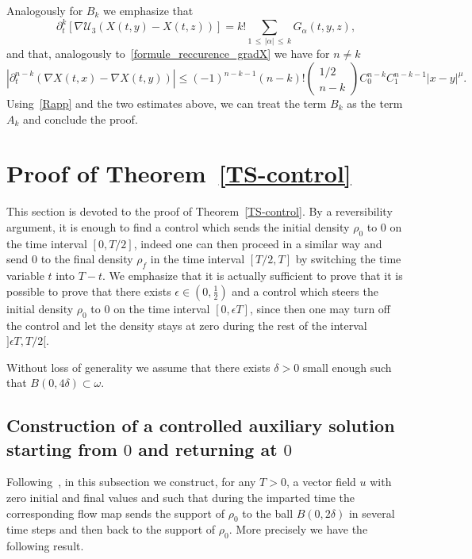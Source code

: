 \documentclass[AHL,Unicode,longabstracts,published]{cedram}
\newcommand{\clU}{\mathcal{U}}
\renewcommand{\leq}{\leqslant}
\newcommand{\eps}{\epsilon}
\begin{document}
Analogously for $B_k$ we emphasize that
\[
\partial_t^k \left[\nabla \clU_3(X(t,y)-X(t,z)) \right]=k! \underset{1\,\leq\,|\alpha|\,\leq\,k}{\sum} G_\alpha(t,y,z),
\]
and that, analogously to~\eqref{formule_reccurence_gradX} we have for $n \neq k$
\[
\left| \partial_t^{n-k}\left(\nabla X(t,x)-\nabla X(t,y)\right) \right|\leq (-1)^{n-k-1}(n-k)!
\begin{pmatrix}
1/2 \\ n-k
\end{pmatrix} C_0^{n-k} C_1^{n-k-1} |x-y|^\mu.
\]
Using~\eqref{Rapp} and the two estimates above, we can treat the term $B_k$ as the term $A_k$ and conclude the proof.



\section{Proof of Theorem~\ref{TS-control}}\label{sec-cont}
\label{sec-control}
This section is devoted to the proof of Theorem~\ref{TS-control}. By a reversibility argument, it is enough to find a control which sends the initial density $\rho_0$ to $0$ on the time interval $[0,T/2]$, indeed one can then proceed in a similar way and send $0$ to the final density $\rho_f$ in the time interval $[T/2,T]$ by switching the time variable $t$ into $T-t$. We emphasize that it is actually sufficient to prove that it is possible to prove that there exists $\eps\in (0,\frac12)$ and a control which steers the initial density $\rho_0$ to $0$ on the time interval $[0,\eps T]$, since then one may turn off the control and let the density stays at zero during the rest of the interval $]\epsilon T, T/2[$.


Without loss of generality we assume that there exists $\delta>0$ small enough such that $B(0,4\delta) \subset \omega$.



\subsection{Construction of a controlled auxiliary solution starting from \texorpdfstring{$0$}{0} and returning at \texorpdfstring{$0$}{0}}


Following~\cite{G20}, in this subsection we construct, for any $T>0$, a vector field $u$ with zero initial and final values and such that during the imparted time the corresponding flow map sends the support of $\rho_0$ to the ball $B(0,2 \delta) $ in several time steps and then back to the support of $\rho_0$. More precisely we have the following result.
\end{document}
